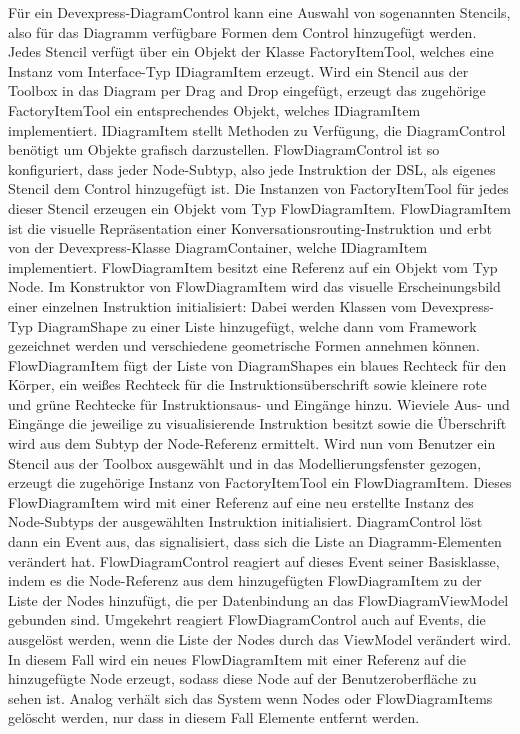 Für ein Devexpress-DiagramControl kann eine Auswahl von sogenannten Stencils, also für das Diagramm verfügbare Formen dem Control hinzugefügt werden. Jedes Stencil verfügt über ein Objekt der Klasse FactoryItemTool, welches eine Instanz vom Interface-Typ IDiagramItem erzeugt. Wird ein Stencil aus der Toolbox in das Diagram per Drag and Drop eingefügt, erzeugt das zugehörige FactoryItemTool ein entsprechendes Objekt, welches IDiagramItem implementiert. IDiagramItem stellt Methoden zu Verfügung, die DiagramControl benötigt um Objekte grafisch darzustellen. FlowDiagramControl ist so konfiguriert, dass jeder Node-Subtyp, also jede Instruktion der DSL, als eigenes Stencil dem Control hinzugefügt ist. Die Instanzen von FactoryItemTool für jedes dieser Stencil erzeugen ein Objekt vom Typ FlowDiagramItem. FlowDiagramItem ist die visuelle Repräsentation einer Konversationsrouting-Instruktion und erbt von der Devexpress-Klasse DiagramContainer, welche IDiagramItem implementiert. FlowDiagramItem besitzt eine Referenz auf ein Objekt vom Typ Node. Im Konstruktor von FlowDiagramItem wird das visuelle Erscheinungsbild einer einzelnen Instruktion initialisiert: Dabei werden Klassen vom Devexpress-Typ DiagramShape zu einer Liste hinzugefügt, welche dann vom Framework gezeichnet werden und verschiedene geometrische Formen annehmen können. FlowDiagramItem fügt der Liste von DiagramShapes ein blaues Rechteck für den Körper, ein weißes Rechteck für die Instruktionsüberschrift sowie kleinere rote und grüne Rechtecke für Instruktionsaus- und Eingänge hinzu. Wieviele Aus- und Eingänge die jeweilige zu visualisierende Instruktion besitzt sowie die Überschrift wird aus dem Subtyp der Node-Referenz ermittelt.
\newline
Wird nun vom Benutzer ein Stencil aus der Toolbox ausgewählt und in das Modellierungsfenster gezogen, erzeugt die zugehörige Instanz von FactoryItemTool ein FlowDiagramItem. Dieses FlowDiagramItem wird mit einer Referenz auf eine neu erstellte Instanz des Node-Subtyps der ausgewählten Instruktion initialisiert. DiagramControl löst dann ein Event aus, das signalisiert, dass sich die Liste an Diagramm-Elementen verändert hat. FlowDiagramControl reagiert auf dieses Event seiner Basisklasse, indem es die Node-Referenz aus dem hinzugefügten FlowDiagramItem zu der Liste der Nodes hinzufügt, die per Datenbindung an das FlowDiagramViewModel gebunden sind. Umgekehrt reagiert FlowDiagramControl auch auf Events, die ausgelöst werden, wenn die Liste der Nodes durch das ViewModel verändert wird. In diesem Fall wird ein neues FlowDiagramItem mit einer Referenz auf die hinzugefügte Node erzeugt, sodass diese Node auf der Benutzeroberfläche zu sehen ist. Analog verhält sich das System wenn Nodes oder FlowDiagramItems gelöscht werden, nur dass in diesem Fall Elemente entfernt werden.
